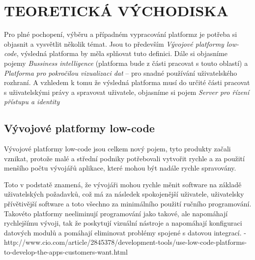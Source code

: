 \chapter{TEORETICKÁ VÝCHODISKA}
\par Pro plné pochopení, výběru a případném vypracování platformz je potřeba si objasnit a vysvětlit několik témat. Jsou to především \textit{Vývojové platformy low-code}, výsledná platforma by měla splňovat tuto definici. Dále si objasníme pojemy \textit{Bussiness intelligence} (platforma bude z části pracovat s touto oblastí) a \textit{Platforma pro pokročilou vizualizaci dat} -- pro snadné používání uživatelského rozhraní. A vzhledem k tomu že výsledná platforma musí do určité části pracovat s uživatelskými právy a spravovat uživatele, objasníme si pojem \textit{Server pro řízení přístupu a identity}

\section{Vývojové platformy low-code}
\par Vývojové platformy low-code jsou celkem nový pojem, tyto produkty začali vznikat, protože malé a střední podniky potřebovali vytvořit rychle a za použití menšího počtu vývojářů aplikace, které mohou být nadále rychle spravovány. \cite{pcmag-no-coding}

\par Toto v podstatě znamená, že vývojáři mohou rychle měnit software na základě uživatelských požadavků, což má za následek spokojenější uživatele, uživatelsky přívětivější software a toto všechno za minimálního použití ručního programování. Takovéto platformy neeliminují programování jako takové, ale napomáhají rychlejšímu vývoji, tak že poskytují vizuální nástroje a napomáhají konfiguraci datových modulů a pomáhají eliminovat problémy spojené s  datovou integrací. - http://www.cio.com/article/2845378/development-tools/use-low-code-platforms-to-develop-the-apps-customers-want.html

